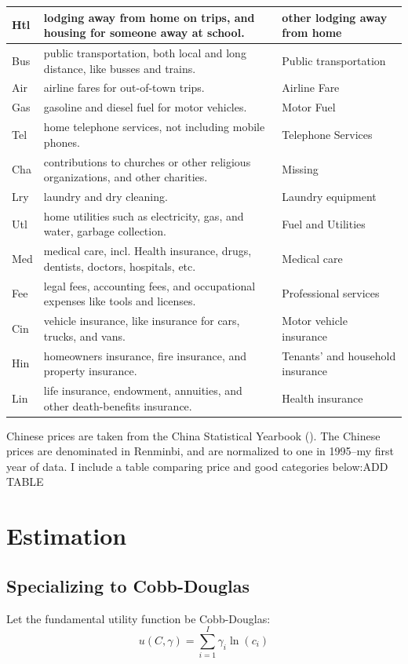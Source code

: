 \documentclass{article}
\begin{document}
\begin{sideways}
\begin{tabular}{|l|l|l|}
\hline
Htl & lodging away from home on trips, and housing for someone away at school. & other lodging away from home\\ 
\hline
Bus & public transportation, both local and long distance, like busses and trains. & Public transportation\\ 
\hline
Air & airline fares for out-of-town trips. & Airline Fare\\ 
\hline
Gas & gasoline and diesel fuel for motor vehicles. & Motor Fuel\\ 
\hline
Tel & home telephone services, not including mobile phones. & Telephone Services\\ 
\hline
Cha & contributions to churches or other religious organizations, and other charities. & Missing\\ 
\hline
Lry & laundry and dry cleaning. & Laundry equipment\\ 
\hline
Utl & home utilities such as electricity, gas, and water, garbage collection. & Fuel and Utilities\\ 
\hline
Med & medical care, incl. Health insurance, drugs, dentists, doctors, hospitals, etc. & Medical care\\ 
\hline
Fee & legal fees, accounting fees, and occupational expenses like tools and licenses. & Professional services\\ 
\hline
Cin & vehicle insurance, like insurance for cars, trucks, and vans. & Motor vehicle insurance\\ 
\hline
Hin & homeowners insurance, fire insurance, and property insurance. & Tenants' and household insurance\\ 
\hline
Lin & life insurance, endowment, annuities, and other death-benefits insurance. & Health insurance\\ 
\hline
\end{tabular}
\end{sideways}

Chinese prices are taken from the China Statistical Yearbook (\citep{CSY}).  The Chinese prices are denominated in Renminbi, and are normalized to one in 1995--my first year of data. I include a table comparing price and good categories below:ADD TABLE 

\section{Estimation}
\subsection{Specializing to Cobb-Douglas}
Let the fundamental utility function be Cobb-Douglas:
\[u(C,\gamma) = \sum_{i=1}^{I} \gamma_i \ln(c_i)\]
\end{document}
